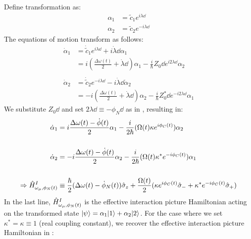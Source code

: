 Define transformation as:
\begin{align}
\alpha_1 &= \tilde{c}_1e^{i\lambda\dd} \\
\alpha_2 &= \tilde{c}_2e^{-i\lambda\dd}
\end{align}
The equations of motion transform as follows:
\begin{align}
\dot{\alpha}_1 & = \dot{\tilde{c}}_1 e^{i \lambda\dd} + i \dot{\lambda}\dd \alpha_1 \\
& =  i(\frac{\Delta \omega(t)}{2} + \dot{\lambda}\dd)\alpha_1 - \frac{i}{\hbar}Z_0\dd e^{i2\lambda\dd}\alpha_2\\
& \nonumber \\
\dot{\alpha}_2 & = \dot{\tilde{c}}_2 e^{-i \lambda\dd} - i \dot{\lambda}\dd\dot{\alpha}_2 \\
& =  -i(\frac{\Delta \omega(t)}{2} + \dot{\lambda}\dd)\alpha_2- \frac{i}{\hbar}Z_0^*\dd e^{-i2\lambda\dd}\alpha_1
\end{align}
We substitute $Z_0\dd$ and set $2\lambda\dd \equiv -\phi_N\dd$  as in \cite{soare}, resulting in:
\begin{align}
\dot{\alpha}_1 & =  i\frac{\Delta \omega(t) - \dot{\phi}(t)}{2}\alpha_1 - \frac{i}{2\hbar}(\Omega(t) \kappa e^{i\phi_C(t)}) \alpha_2\\
& \nonumber \\
\dot{\alpha}_2 & =  -i\frac{\Delta \omega(t) - \dot{\phi}(t)}{2}\alpha_2- \frac{i}{2\hbar}(\Omega(t) \kappa^* e^{-i\phi_C(t)})\alpha_1\\
&\nonumber \\
\Rightarrow \hat{H}^{I}_{\omega_\mu,\phi_N(t)} &\equiv \frac{\hbar}{2}(\Delta \omega(t)- \dot{\phi}_N(t))\hat{\sigma}_{z} + \frac{\Omega(t)}{2} (\kappa e^{i\phi_C(t)}\hat{\sigma}_{-} + \kappa^* e^{-i\phi_C(t)}\hat{\sigma}_{+}) \label{eqn:Hi}
\end{align}
In the last line, $\hat{H}^{I}_{\omega_\mu,\phi_N(t)}$ is the effective interaction picture Hamiltonian acting on the transformed state $| \psi \rangle = \alpha_1| 1 \rangle + \alpha_2| 2 \rangle$. For the case where we set $\kappa^* = \kappa \equiv 1$ (real coupling constant), we recover the effective interaction picture Hamiltonian in \cite{soare}:

